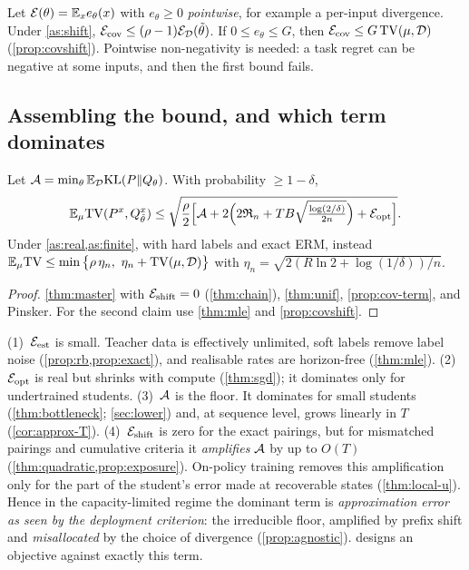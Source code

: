 \begin{proposition}\label{prop:cov-term}
\Pv Let $\mathcal{E}(\theta)=\mathbb{E}_x e_\theta(x)$ with $e_\theta\ge0$ \emph{pointwise}, for example a per-input divergence.
Under \cref{as:shift}, $\mathcal{E}_{\mathrm{cov}}\le(\rho-1)\mathcal{E}_{\mathcal{D}}(\tilde\theta)$. If $0\le e_\theta\le G$, then
$\mathcal{E}_{\mathrm{cov}}\le G\,\mathrm{TV}(\mu,\mathcal{D})$ (\cref{prop:covshift}). Pointwise non-negativity is needed: a task regret
can be negative at some inputs, and then the first bound fails.
\end{proposition}



\subsection{Assembling the bound, and which term dominates}

\begin{corollary}\label{cor:e2e-offpolicy}
 Let $\mathcal{A}=\min_\theta\mathbb{E}_{\mathcal{D}}\mathrm{KL}(P\|Q_\theta)$. With probability $\ge1-\delta$,
\[
\mathbb{E}_\mu\mathrm{TV}(P^{x},Q^x_{\tilde\theta})\le\sqrt{\frac\rho2\Big[\mathcal{A}+2\Big(2\mathfrak{R}_n+TB\sqrt{\tfrac{\log(2/\delta)}{2n}}\Big)+\mathcal{E}_{\mathrm{opt}}\Big]}.
\]
Under \cref{as:real,as:finite}, with hard labels and exact ERM, instead
$\E_\mu\TV\le\min\big\{\rho\,\eta_n,\ \eta_n+\TV(\mu,\cD)\big\}$ with $\eta_n=\sqrt{2(R\ln2+\log(1/\delta))/n}$.
\end{corollary}
\begin{proof}
\cref{thm:master} with $\mathcal{E}_{\mathrm{shift}}=0$ (\cref{thm:chain}), \cref{thm:unif}, \cref{prop:cov-term},
and Pinsker. For the second claim use \cref{thm:mle} and \cref{prop:covshift}.
\end{proof}

\begin{heuristic}\label{heur:dominant}
(1)~$\mathcal{E}_{\mathrm{est}}$ is small. Teacher data is effectively unlimited, soft labels remove label noise
(\cref{prop:rb,prop:exact}), and realisable rates are horizon-free (\cref{thm:mle}).
(2)~$\mathcal{E}_{\mathrm{opt}}$ is real but shrinks with compute (\cref{thm:sgd}); it dominates only for
undertrained students.
(3)~$\mathcal{A}$ is the floor. It dominates for small students (\cref{thm:bottleneck}; \cref{sec:lower}) and, at
sequence level, grows linearly in $T$ (\cref{cor:approx-T}).
(4)~$\mathcal{E}_{\mathrm{shift}}$ is zero for the exact pairings, but for mismatched pairings and cumulative
criteria it \emph{amplifies} $\mathcal{A}$ by up to $O(T)$ (\cref{thm:quadratic,prop:exposure}). On-policy training removes
this amplification only for the part of the student's error made at recoverable states (\cref{thm:local-u}).
Hence in the capacity-limited regime the dominant term is \emph{approximation error as seen by the
deployment criterion}: the irreducible floor, amplified by prefix shift and \emph{misallocated} by the
choice of divergence (\cref{prop:agnostic}).  designs an objective against exactly
this term.
\end{heuristic}
